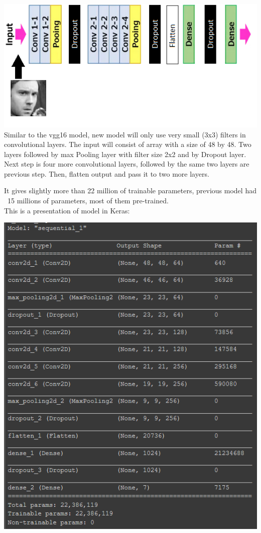 \includegraphics[scale=1]{images/modelTwo/modelImg.png}
Similar to the vgg16 model, new model will only use very small (3x3) filters in convolutional layers. The input will consist of array with a size of 48 by 48. Two layers followed by max Pooling layer with filter size 2x2 and by Dropout layer. Next step is four more convolutional layers, followed by the same two layers are previous step. Then, flatten output and pass it to two more layers.

It gives slightly more than 22 million of trainable parameters, previous model had ~15 millions of parameters, most of them pre-trained.
\\This is a presentation of model in Keras:\\
\begin{center}
    \includegraphics[scale=0.70]{images/modelTwo/kerasModel.png}
\end{center}
